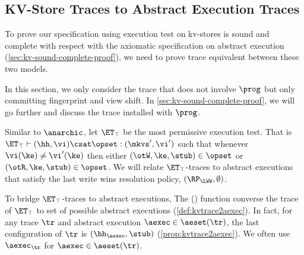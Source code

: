 \subsection{KV-Store Traces to Abstract Execution Traces}
\label{sec:kvtrace2aexec}

To prove our specification using execution test on kv-stores 
is sound and complete with respect with the axiomatic specification on abstract execution (\cref{sec:kv-sound-complete-proof}),
we need to prove trace equivalent between these two models.

In this section, we only consider the trace that does not involve \( \prog \) but only committing fingerprint and view shift.
In \cref{sec:kv-sound-complete-proof}, we will go further and discuss the trace installed with \( \prog \).

Similar to \(\anarchic\), let $\ET_\top$ be the most permissive execution test.
That is $\ET_\top \vdash (\hh, \vi) \csat \opset: (\mkvs',\vi')$ 
such that whenever $\vi(\ke) \neq \vi'(\ke)$ then either $(\otW, \ke, \stub) \in \opset$ or $(\otR, \ke, \stub) \in \opset$.
We will relate $\ET_{\top}$-traces to abstract executions that satisfy the last write wins resolution policy, \ie \( (\RP_\LWW, \emptyset) \).

To bridge $\ET_{\top}$-traces to abstract executions, 
The \aeset(\tr) function converse the trace of \( \ET_\top \) to set of possible abstract executions (\cref{def:kvtrace2aexec}).
In fact, for any trace \( \tr \) and abstract execution $\aexec \in \aeset(\tr)$, 
the last configuration of $\tr$ is $(\hh_{\aexec}, \stub)$ (\cref{prop:kvtrace2aexec}).
We often use \( \aexec_\tr \) for \( \aexec \in \aeset(\tr) \).

